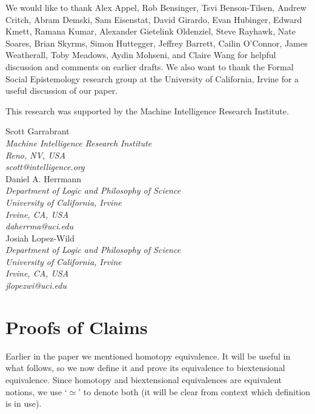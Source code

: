 \documentclass{article}
\begin{document}
We would like to thank Alex Appel, Rob Bensinger, Tsvi Benson-Tilsen, Andrew Critch, Abram Demski, Sam Eisenstat, David Girardo, Evan Hubinger, Edward Kmett, Ramana Kumar, Alexander Gietelink Oldenziel, Steve Rayhawk, Nate Soares, Brian Skyrms, Simon Huttegger, Jeffrey Barrett, Cailin O'Connor, James Weatherall, Toby Meadows, Aydin Mohseni, and Claire Wang for helpful discussion and comments on earlier drafts. We also want to thank the Formal Social Epistemology research group at the University of California, Irvine for a useful discussion of our paper.

This research was supported by the Machine Intelligence Research Institute.

\begin{flushright}

  Scott Garrabrant\\
\emph{
  Machine Intelligence Research Institute\\
  Reno, NV, USA\\
  scott@intelligence.org\\
}
\vspace{0.5cm}
  Daniel A. Herrmann\\
\emph{
  Department of Logic and Philosophy of Science\\
  University of California, Irvine\\
  Irvine, CA, USA\\
  daherrma@uci.edu\\
}
\vspace{0.5cm}
  Josiah Lopez-Wild\\
\emph{
  Department of Logic and Philosophy of Science\\
  University of California, Irvine\\
  Irvine, CA, USA\\
  jlopezwi@uci.edu\\
}
\end{flushright}


\appendix 

\section{Proofs of Claims}

Earlier in the paper we mentioned homotopy equivalence.
It will be useful in what follows, so we now define it and prove its equivalence to biextensional equivalence.
Since homotopy and biextensional equivalences are equivalent notions, we use `$\simeq$' to denote both (it will be clear from context which definition is in use).
\end{document}
